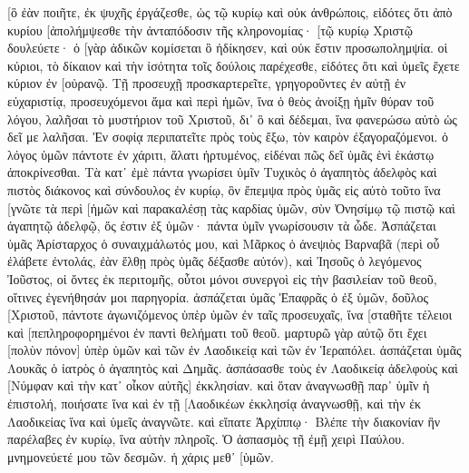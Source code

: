 [ὃ ἐὰν ποιῆτε, ἐκ ψυχῆς ἐργάζεσθε, ὡς τῷ κυρίῳ καὶ οὐκ ἀνθρώποις, 
εἰδότες ὅτι ἀπὸ κυρίου [ἀπολήμψεσθε τὴν ἀνταπόδοσιν τῆς κληρονομίας· [τῷ κυρίῳ Χριστῷ δουλεύετε· 
ὁ [γὰρ ἀδικῶν κομίσεται ὃ ἠδίκησεν, καὶ οὐκ ἔστιν προσωπολημψία. 
οἱ κύριοι, τὸ δίκαιον καὶ τὴν ἰσότητα τοῖς δούλοις παρέχεσθε, εἰδότες ὅτι καὶ ὑμεῖς ἔχετε κύριον ἐν [οὐρανῷ. 
Τῇ προσευχῇ προσκαρτερεῖτε, γρηγοροῦντες ἐν αὐτῇ ἐν εὐχαριστίᾳ, 
προσευχόμενοι ἅμα καὶ περὶ ἡμῶν, ἵνα ὁ θεὸς ἀνοίξῃ ἡμῖν θύραν τοῦ λόγου, λαλῆσαι τὸ μυστήριον τοῦ Χριστοῦ, δι᾽ ὃ καὶ δέδεμαι, 
ἵνα φανερώσω αὐτὸ ὡς δεῖ με λαλῆσαι. 
Ἐν σοφίᾳ περιπατεῖτε πρὸς τοὺς ἔξω, τὸν καιρὸν ἐξαγοραζόμενοι. 
ὁ λόγος ὑμῶν πάντοτε ἐν χάριτι, ἅλατι ἠρτυμένος, εἰδέναι πῶς δεῖ ὑμᾶς ἑνὶ ἑκάστῳ ἀποκρίνεσθαι. 
Τὰ κατ᾽ ἐμὲ πάντα γνωρίσει ὑμῖν Τυχικὸς ὁ ἀγαπητὸς ἀδελφὸς καὶ πιστὸς διάκονος καὶ σύνδουλος ἐν κυρίῳ, 
ὃν ἔπεμψα πρὸς ὑμᾶς εἰς αὐτὸ τοῦτο ἵνα [γνῶτε τὰ περὶ [ἡμῶν καὶ παρακαλέσῃ τὰς καρδίας ὑμῶν, 
σὺν Ὀνησίμῳ τῷ πιστῷ καὶ ἀγαπητῷ ἀδελφῷ, ὅς ἐστιν ἐξ ὑμῶν· πάντα ὑμῖν γνωρίσουσιν τὰ ὧδε. 
Ἀσπάζεται ὑμᾶς Ἀρίσταρχος ὁ συναιχμάλωτός μου, καὶ Μᾶρκος ὁ ἀνεψιὸς Βαρναβᾶ (περὶ οὗ ἐλάβετε ἐντολάς, ἐὰν ἔλθῃ πρὸς ὑμᾶς δέξασθε αὐτόν), 
καὶ Ἰησοῦς ὁ λεγόμενος Ἰοῦστος, οἱ ὄντες ἐκ περιτομῆς, οὗτοι μόνοι συνεργοὶ εἰς τὴν βασιλείαν τοῦ θεοῦ, οἵτινες ἐγενήθησάν μοι παρηγορία. 
ἀσπάζεται ὑμᾶς Ἐπαφρᾶς ὁ ἐξ ὑμῶν, δοῦλος [Χριστοῦ, πάντοτε ἀγωνιζόμενος ὑπὲρ ὑμῶν ἐν ταῖς προσευχαῖς, ἵνα [σταθῆτε τέλειοι καὶ [πεπληροφορημένοι ἐν παντὶ θελήματι τοῦ θεοῦ. 
μαρτυρῶ γὰρ αὐτῷ ὅτι ἔχει [πολὺν πόνον] ὑπὲρ ὑμῶν καὶ τῶν ἐν Λαοδικείᾳ καὶ τῶν ἐν Ἱεραπόλει. 
ἀσπάζεται ὑμᾶς Λουκᾶς ὁ ἰατρὸς ὁ ἀγαπητὸς καὶ Δημᾶς. 
ἀσπάσασθε τοὺς ἐν Λαοδικείᾳ ἀδελφοὺς καὶ [Νύμφαν καὶ τὴν κατ᾽ οἶκον αὐτῆς] ἐκκλησίαν. 
καὶ ὅταν ἀναγνωσθῇ παρ᾽ ὑμῖν ἡ ἐπιστολή, ποιήσατε ἵνα καὶ ἐν τῇ [Λαοδικέων ἐκκλησίᾳ ἀναγνωσθῇ, καὶ τὴν ἐκ Λαοδικείας ἵνα καὶ ὑμεῖς ἀναγνῶτε. 
καὶ εἴπατε Ἀρχίππῳ· Βλέπε τὴν διακονίαν ἣν παρέλαβες ἐν κυρίῳ, ἵνα αὐτὴν πληροῖς. 
Ὁ ἀσπασμὸς τῇ ἐμῇ χειρὶ Παύλου. μνημονεύετέ μου τῶν δεσμῶν. ἡ χάρις μεθ᾽ [ὑμῶν. 
